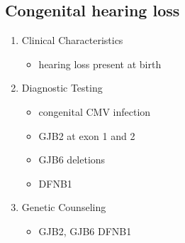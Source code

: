 \documentclass[12pt]{scrartcl}
\begin{document}
\subsection{Congenital hearing loss}
\label{sec:orga253b66}
\begin{enumerate}
\item Clinical Characteristics
\label{sec:org8091c93}
\begin{itemize}
\item hearing loss present at birth
\end{itemize}
\item Diagnostic Testing
\label{sec:orge59e13d}
\begin{itemize}
\item congenital CMV infection
\item GJB2 at exon 1 and 2
\item GJB6 deletions
\item DFNB1
\end{itemize}
\item Genetic Counseling
\label{sec:org4a1c659}
\begin{itemize}
\item GJB2, GJB6 DFNB1
\end{itemize}
\end{enumerate}
\end{document}
